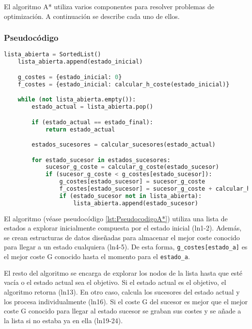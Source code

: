 El algoritmo A* utiliza varios componentes para resolver problemas
de optimización. A continuación se describe cada uno de ellos.

\pagebreak

\subsubsection{Pseudocódigo}

\begin{lstlisting}[language=Python, caption=Pseudocódigo del algoritmo A*, label=lst:PseudocodigoA*]
    lista_abierta = SortedList()
    lista_abierta.append(estado_inicial)

    g_costes = {estado_inicial: 0}
    f_costes = {estado_inicial: calcular_h_coste(estado_inicial)}

    while (not lista_abierta.empty()):
        estado_actual = lista_abierta.pop()

        if (estado_actual == estado_final):
            return estado_actual

        estados_sucesores = calcular_sucesores(estado_actual)

        for estado_sucesor in estados_sucesores:
            sucesor_g_coste = calcular_g_coste(estado_sucesor)
            if (sucesor_g_coste < g_costes[estado_sucesor]):
                g_costes[estado_sucesor] = sucesor_g_coste
                f_costes[estado_sucesor] = sucesor_g_coste + calcular_h_coste(estado_sucesor)
                if (estado_sucesor not in lista_abierta):
                    lista_abierta.append(estado_sucesor)
\end{lstlisting}

El algoritmo (véase pseudocódigo \ref{lst:PseudocodigoA*}) utiliza una lista de estados a explorar
inicialmente compuesta por el estado inicial (ln1-2).
Además, se crean estructuras de datos diseñadas para almacenar
el mejor coste conocido para llegar a un estado cualquiera (ln4-5).
De esta forma, \lstinline{g_costes[estado_a]} es el mejor coste G
conocido hasta el momento para el \lstinline{estado_a}.

El resto del algoritmo se encarga de explorar los nodos
de la lista hasta que esté vacía o el estado actual sea el objetivo.
Si el estado actual es el objetivo, el algoritmo retorna (ln13).
En otro caso, calcula los sucesores del estado actual
y los procesa individualmente (ln16).
Si el coste G del sucesor es mejor que el mejor coste G
conocido para llegar al estado sucesor
se graban sus costes y se añade a la lista
si no estaba ya en ella (ln19-24).

